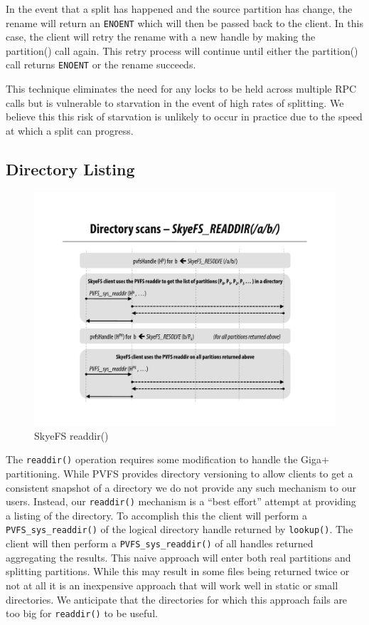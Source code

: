 \documentclass[letterpaper]{article}
\newcommand{\code}[1]{\texttt{#1}}
\begin{document}
In the event that a split has happened and the source partition has change, the
rename will return an \code{ENOENT} which will then be passed back to the client.  In
this case, the client will retry the rename with a new handle by making the
partition() call again.  This retry process will continue until either the
partition() call returns \code{ENOENT} or the rename succeeds.  

This technique eliminates the need for any locks to be held across multiple RPC
calls but is vulnerable to starvation in the event of high rates of splitting.
We believe this this risk of starvation is unlikely to occur in practice due to
the speed at which a split can progress.

\subsection{Directory Listing}
\begin{figure}
\begin{center}
\includegraphics[scale=0.4]{figure-readdir}
\end{center}
\caption{SkyeFS readdir()}
\end{figure}
The \code{readdir()} operation requires some modification to handle the Giga+
partitioning.  While PVFS provides directory versioning to allow clients to
get a consistent snapshot of a directory we do not provide any such mechanism
to our users.  Instead, our \code{readdir()} mechanism is a ``best effort'' attempt
at providing a listing of the directory.  To accomplish this the client will
perform a \code{PVFS\_sys\_readdir()} of the logical directory handle returned by
\code{lookup()}.  The client will then perform a \code{PVFS\_sys\_readdir()} of all handles
returned aggregating the results.  This naive approach will enter both real
partitions and splitting partitions.  While this may result in some files
being returned twice or not at all it is an inexpensive approach that will
work well in static or small directories.  We anticipate that the directories
for which this approach fails are too big for \code{readdir()} to be useful.
\end{document}
